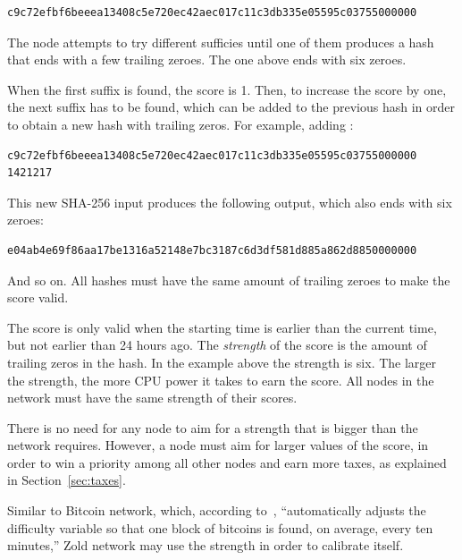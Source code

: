 \documentclass{main}
\begin{document}
\begin{verbatim}
c9c72efbf6beeea13408c5e720ec42aec017c11c3db335e05595c03755000000
\end{verbatim}

The node attempts to try different sufficies until one of them produces
a hash that ends with a few trailing zeroes. The one above ends
with six zeroes.

When the first suffix is found, the score is 1. Then, to
increase the score by one, the next suffix has to be found, which
can be added to the previous hash
in order to obtain a new hash with trailing zeros. For example,
adding :

\begin{verbatim}
c9c72efbf6beeea13408c5e720ec42aec017c11c3db335e05595c03755000000 1421217
\end{verbatim}

This new SHA-256 input produces the following output, which also
ends with six zeroes:

\begin{verbatim}
e04ab4e69f86aa17be1316a52148e7bc3187c6d3df581d885a862d8850000000
\end{verbatim}

And so on. All hashes must have the same amount of trailing zeroes to make
the score valid.

The score is only valid when the starting time is earlier than
the current time, but not earlier than 24 hours ago. The \emph{strength} of the score
is the amount of trailing zeros in the hash. In the example above the
strength is six. The larger the strength, the more CPU power it takes to earn
the score. All nodes in the network must have the same strength of their scores.

There is no need for any node to aim for a strength that is bigger than the network requires.
However, a node must aim for larger values of the score, in order
to win a priority among all other nodes and earn more taxes,
as explained in Section~\ref{sec:taxes}.

Similar to Bitcoin network, which, according to~\textcite{hayes2017},
``automatically adjusts the difficulty
variable so that one block of bitcoins is found, on average, every ten minutes,''
Zold network may use the strength in order to calibrate itself.

\end{document}
